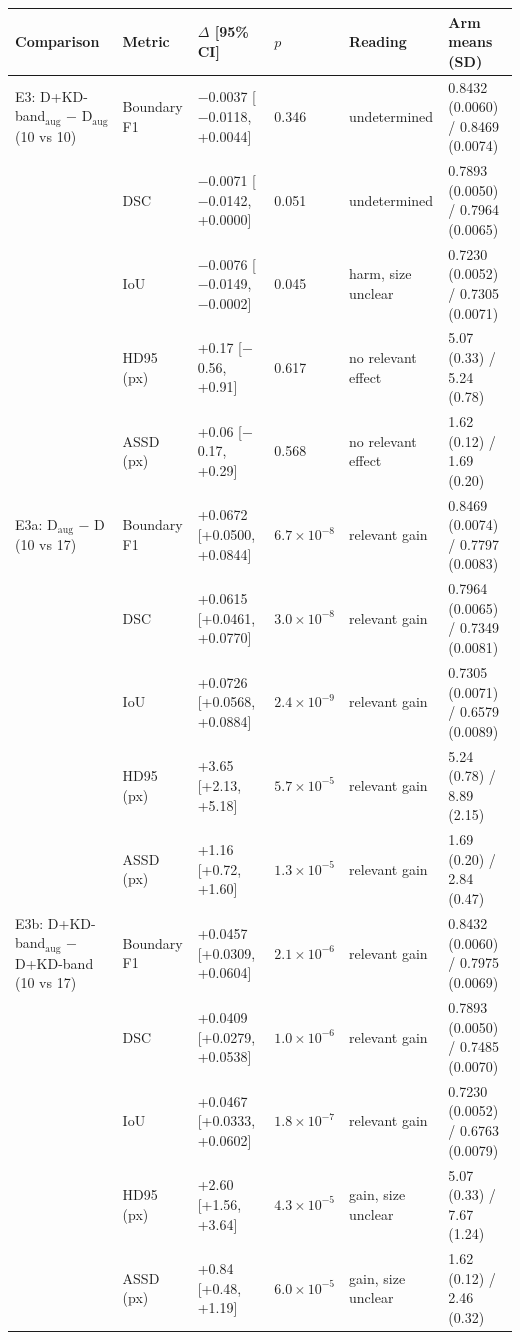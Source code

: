 \begin{tabular}{@{}llllll@{}}
\toprule
Comparison & Metric & $\Delta$ [95\% CI] & $p$ & Reading & Arm means (SD) \\
\midrule
E3: D+KD-band$_{\mathrm{aug}}$ $-$ D$_{\mathrm{aug}}$ (10 vs 10) & Boundary F1 & $-$0.0037 [$-$0.0118, +0.0044] & 0.346 & undetermined & 0.8432 (0.0060) / 0.8469 (0.0074) \\
 & DSC & $-$0.0071 [$-$0.0142, +0.0000] & 0.051 & undetermined & 0.7893 (0.0050) / 0.7964 (0.0065) \\
 & IoU & $-$0.0076 [$-$0.0149, $-$0.0002] & 0.045 & harm, size unclear & 0.7230 (0.0052) / 0.7305 (0.0071) \\
 & HD95 (px) & +0.17 [$-$0.56, +0.91] & 0.617 & no relevant effect & 5.07 (0.33) / 5.24 (0.78) \\
 & ASSD (px) & +0.06 [$-$0.17, +0.29] & 0.568 & no relevant effect & 1.62 (0.12) / 1.69 (0.20) \\
\midrule
E3a: D$_{\mathrm{aug}}$ $-$ D (10 vs 17) & Boundary F1 & +0.0672 [+0.0500, +0.0844] & $6.7\times10^{-8}$ & relevant gain & 0.8469 (0.0074) / 0.7797 (0.0083) \\
 & DSC & +0.0615 [+0.0461, +0.0770] & $3.0\times10^{-8}$ & relevant gain & 0.7964 (0.0065) / 0.7349 (0.0081) \\
 & IoU & +0.0726 [+0.0568, +0.0884] & $2.4\times10^{-9}$ & relevant gain & 0.7305 (0.0071) / 0.6579 (0.0089) \\
 & HD95 (px) & +3.65 [+2.13, +5.18] & $5.7\times10^{-5}$ & relevant gain & 5.24 (0.78) / 8.89 (2.15) \\
 & ASSD (px) & +1.16 [+0.72, +1.60] & $1.3\times10^{-5}$ & relevant gain & 1.69 (0.20) / 2.84 (0.47) \\
\midrule
E3b: D+KD-band$_{\mathrm{aug}}$ $-$ D+KD-band (10 vs 17) & Boundary F1 & +0.0457 [+0.0309, +0.0604] & $2.1\times10^{-6}$ & relevant gain & 0.8432 (0.0060) / 0.7975 (0.0069) \\
 & DSC & +0.0409 [+0.0279, +0.0538] & $1.0\times10^{-6}$ & relevant gain & 0.7893 (0.0050) / 0.7485 (0.0070) \\
 & IoU & +0.0467 [+0.0333, +0.0602] & $1.8\times10^{-7}$ & relevant gain & 0.7230 (0.0052) / 0.6763 (0.0079) \\
 & HD95 (px) & +2.60 [+1.56, +3.64] & $4.3\times10^{-5}$ & gain, size unclear & 5.07 (0.33) / 7.67 (1.24) \\
 & ASSD (px) & +0.84 [+0.48, +1.19] & $6.0\times10^{-5}$ & gain, size unclear & 1.62 (0.12) / 2.46 (0.32) \\
\bottomrule
\end{tabular}
